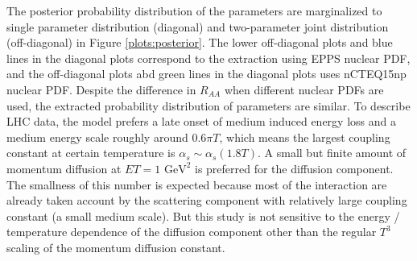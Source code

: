\documentclass[aps, prc, reprint, amsmath, groupedaddress, nofootinbib]{revtex4-1}
\begin{document}
The posterior probability distribution of the parameters are marginalized to single parameter distribution (diagonal) and two-parameter joint distribution (off-diagonal) in Figure \ref{plots:posterior}.
The lower off-diagonal plots and blue lines in the diagonal plots correspond to the extraction using EPPS nuclear PDF, and the off-diagonal plots abd green lines in the diagonal plots uses nCTEQ15np nuclear PDF.
Despite the difference in $R_{AA}$ when different nuclear PDFs are used, the extracted probability distribution of parameters are similar.
To describe LHC data, the model prefers a late onset of medium induced energy loss and a medium energy scale roughly around $0.6\pi T$, which means the largest coupling constant at certain temperature is $\alpha_s \sim \alpha_s(1.8T)$.
A small but finite amount of momentum diffusion at $ET=1\textrm{ GeV}^2$ is preferred for the diffusion component.
The smallness of this number is expected because most of the interaction are already taken account by the scattering component with relatively large coupling constant (a small medium scale).
But this study is not sensitive to the energy / temperature dependence of the diffusion component other than the regular $T^3$ scaling of the momentum diffusion constant.   
\end{document}
